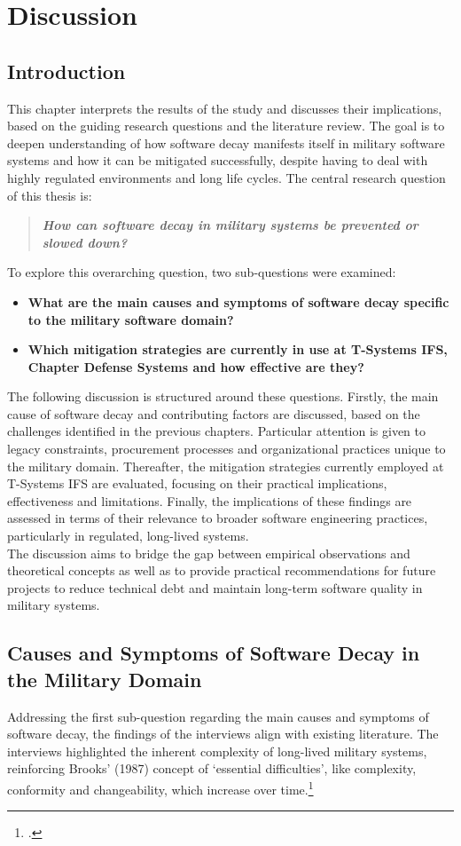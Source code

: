 \section{Discussion}
\subsection{Introduction}
This chapter interprets the results of the study and discusses their implications, based on the guiding research questions and the literature review. The goal is to deepen understanding of how software decay manifests itself in military software systems
and how it can be mitigated successfully, despite having to deal with highly regulated environments and long life cycles.
The central research question of this thesis is:
\begin{quote}
\textit{\textbf{How can software decay in military systems be prevented or slowed down?}}
\end{quote}
To explore this overarching question, two sub-questions were examined:
\begin{itemize}
    \item \textbf{What are the main causes and symptoms of software decay specific to the military software domain?}
    \item \textbf{Which mitigation strategies are currently in use at T-Systems IFS, Chapter Defense Systems and how effective are they?}
\end{itemize}
The following discussion is structured around these questions. Firstly, the main cause of software decay and contributing factors are discussed, based on the challenges identified in the previous chapters. Particular attention is given to legacy constraints, procurement processes and organizational practices unique to the military domain.
Thereafter, the mitigation strategies currently employed at T-Systems IFS are evaluated, focusing on their practical implications, effectiveness and limitations. Finally, the implications of these findings are assessed in terms of their relevance to broader software engineering practices, particularly in regulated, long-lived systems.\\
The discussion aims to bridge the gap between empirical observations and theoretical concepts as well as to provide practical recommendations for future projects to reduce technical debt and maintain long-term software quality in military systems.

\subsection{Causes and Symptoms of Software Decay in the Military Domain}
Addressing the first sub-question regarding the main causes and symptoms of software decay, the findings of the interviews align with existing literature. The interviews highlighted the inherent complexity of long-lived military systems, reinforcing Brooks' (1987) concept of `essential difficulties', like complexity, conformity and changeability, which increase over time.\footcite[2-3]{brooksNoSilverBullet1987}\\

